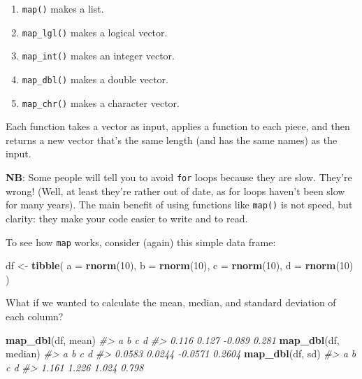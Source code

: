 \documentclass[]{book}
\newenvironment{Shaded}{\begin{snugshade}}{\end{snugshade}}
\newcommand{\CommentTok}[1]{\textcolor[rgb]{0.56,0.35,0.01}{\textit{#1}}}
\newcommand{\DataTypeTok}[1]{\textcolor[rgb]{0.13,0.29,0.53}{#1}}
\newcommand{\DecValTok}[1]{\textcolor[rgb]{0.00,0.00,0.81}{#1}}
\newcommand{\KeywordTok}[1]{\textcolor[rgb]{0.13,0.29,0.53}{\textbf{#1}}}
\newcommand{\NormalTok}[1]{#1}
\newcommand{\StringTok}[1]{\textcolor[rgb]{0.31,0.60,0.02}{#1}}
\providecommand{\tightlist}{%
  \setlength{\itemsep}{0pt}\setlength{\parskip}{0pt}}
\begin{document}
\begin{enumerate}
\def\labelenumi{\arabic{enumi}.}
\tightlist
\item
  \texttt{map()} makes a list.
\item
  \texttt{map\_lgl()} makes a logical vector.
\item
  \texttt{map\_int()} makes an integer vector.
\item
  \texttt{map\_dbl()} makes a double vector.
\item
  \texttt{map\_chr()} makes a character vector.
\end{enumerate}

Each function takes a vector as input, applies a function to each piece, and then returns a new vector that's the same length (and has the same names) as the input.

\textbf{NB}: Some people will tell you to avoid \texttt{for} loops because they are slow. They're wrong! (Well, at least they're rather out of date, as for loops haven't been slow for many years). The main benefit of using functions like \texttt{map()} is not speed, but clarity: they make your code easier to write and to read.

To see how \texttt{map} works, consider (again) this simple data frame:

\begin{Shaded}
\begin{Highlighting}[]
\NormalTok{df <-}\StringTok{ }\KeywordTok{tibble}\NormalTok{(}
  \DataTypeTok{a =} \KeywordTok{rnorm}\NormalTok{(}\DecValTok{10}\NormalTok{),}
  \DataTypeTok{b =} \KeywordTok{rnorm}\NormalTok{(}\DecValTok{10}\NormalTok{),}
  \DataTypeTok{c =} \KeywordTok{rnorm}\NormalTok{(}\DecValTok{10}\NormalTok{),}
  \DataTypeTok{d =} \KeywordTok{rnorm}\NormalTok{(}\DecValTok{10}\NormalTok{)}
\NormalTok{)}
\end{Highlighting}
\end{Shaded}

What if we wanted to calculate the mean, median, and standard deviation of each column?

\begin{Shaded}
\begin{Highlighting}[]
\KeywordTok{map_dbl}\NormalTok{(df, mean)}
\CommentTok{#>      a      b      c      d }
\CommentTok{#>  0.116  0.127 -0.089  0.281}
\KeywordTok{map_dbl}\NormalTok{(df, median)}
\CommentTok{#>       a       b       c       d }
\CommentTok{#>  0.0583  0.0244 -0.0571  0.2604}
\KeywordTok{map_dbl}\NormalTok{(df, sd)}
\CommentTok{#>     a     b     c     d }
\CommentTok{#> 1.161 1.226 1.024 0.798}
\end{Highlighting}
\end{Shaded}
\end{document}
